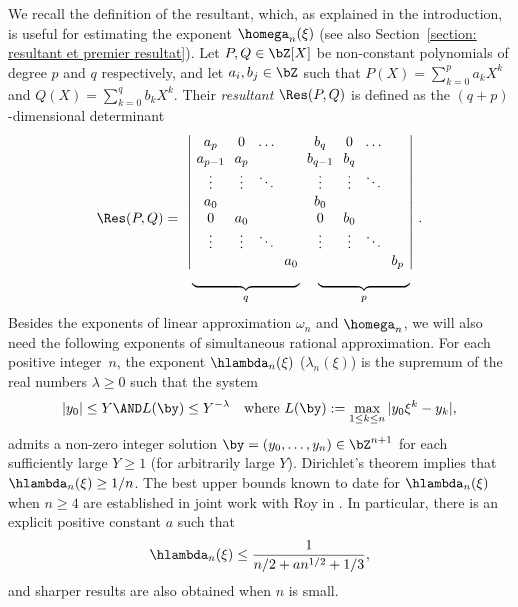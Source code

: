 We recall the definition of the resultant, which, as explained in the introduction, is useful for estimating the exponent $\homega_n(\xi)$ (see also Section~\ref{section: resultant et premier resultat}). Let $P,Q\in\bZ[X]$ be non-constant polynomials of degree $p$ and $q$ respectively, and let $a_i,b_j\in \bZ$ such that $P(X) = \sum_{k=0}^{p} a_kX^k$ and $Q(X) = \sum_{k=0}^{q} b_kX^k$.
Their \emph{resultant} $\Res(P,Q)$ is defined as the $(q+p)$-dimensional determinant
\begin{equation}
\label{eq det resultant}
\arraycolsep3.5pt
\Res(P,Q) = \begin{array}{cc}
\left | \begin{array}{cccc}
a_p & 0 & \dots \\
a_{p-1} & a_p & \\
\vdots & \vdots & \ddots \\
a_0 & \\
0 & a_0 \\
\vdots & \vdots & \ddots \\
& & & a_0
\end{array}\right. &
\left. \hspace*{-10pt}
\begin{array}{cccc}
b_q & 0 & \dots \\
b_{q-1} & b_q & \\
\vdots & \vdots & \ddots \\
b_0 & \\
0 & b_0 \\
\vdots & \vdots & \ddots \\
& & & b_p
\end{array}\right| \\
\underbrace{\hspace*{2.7cm}}_{q} &
\underbrace{\hspace*{2.3cm}}_{p}
\end{array}.
\end{equation}
Besides the exponents of linear approximation $\omega_n$ and $\homega_n$, we will also need the following exponents of simultaneous rational approximation. For each positive integer~$n$, the exponent $\hlambda_n(\xi)$ (\resp $\lambda_n(\xi)$) is the supremum of the real numbers $\lambda \geq 0$ such that the system
\begin{equation*}
|y_0| \leq Y \AND L(\by) \leq Y^{-\lambda} \quad \textrm{where } L(\by):=\max_{1\le k \le n} |y_0\xi^k - y_k|,
\end{equation*}
admits a non-zero integer solution $\by=(y_0,\dots,y_n)\in\bZ^{n+1}$ for each sufficiently large $Y\geq 1$ (\resp for arbitrarily large $Y$). Dirichlet's theorem \cite[\S II.1, Th.\,1A]{schmidt1996diophantine} implies that $\hlambda_n(\xi)\geq 1/n$. The best upper bounds known to date for $\hlambda_n(\xi)$ when $n\geq 4$ are established in joint work with Roy in \cite{poels2022simultaneous}. In particular, there is an explicit positive constant $a$ such that
\[
\hlambda_n(\xi) \leq \frac{1}{n/2+an^{1/2}+1/3},
\]
and sharper results are also obtained when $n$ is small.

